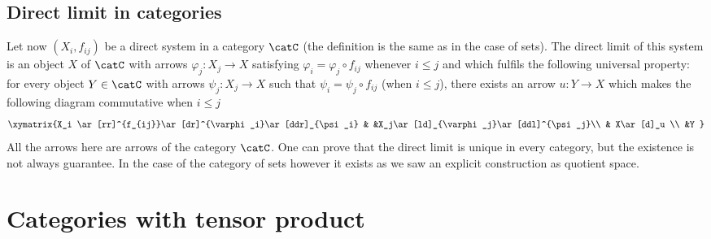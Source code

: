 \subsection{Direct limit in categories}

Let now $(X_i,f_{ij})$ be a direct system in a category $\catC$ (the definition is the same as in the case of sets). The direct limit of this system is an object $X$ of $\catC$ with arrows $\varphi_j\colon X_j\to X$ satisfying $\varphi_i=\varphi_j\circ f_{ij}$ whenever $i\leq j$ and which fulfils the following universal property: for every object $Y\in\catC$ with arrows $\psi_j\colon X_j\to X$ such that $\psi_i=\psi_j\circ f_{ij}$ (when $i\leq j$), there exists an arrow $u\colon Y\to X$ which makes the following diagram commutative when $i\leq j$
\begin{equation}
\xymatrix{%
   X_i \ar[rr]^{f_{ij}}\ar[dr]^{\varphi_i}\ar[ddr]_{\psi_i}		&		&X_j\ar[ld]_{\varphi_j}\ar[ddl]^{\psi_j}\\
									& X\ar[d]_u	\\
   									&Y
}
\end{equation}
All the arrows here are arrows of the category $\catC$. One can prove that the direct limit is unique in every category, but the existence is not always guarantee. In the case of the category of sets however it exists as we saw an explicit construction as quotient space.

\section{Categories with tensor product}


